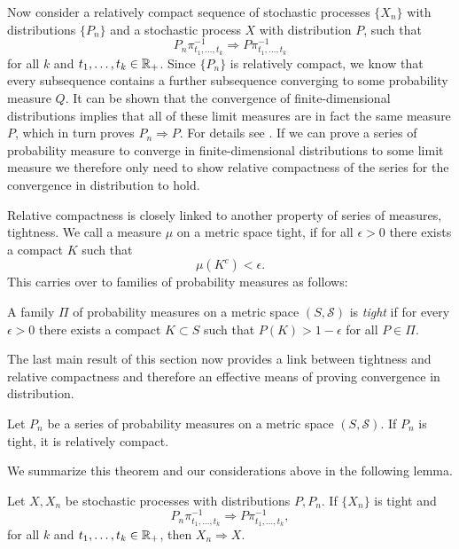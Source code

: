 Now consider a relatively compact sequence of stochastic processes $\{X_n\}$
with distributions $\{P_n\}$
and a stochastic process $X$ with distribution $P$,
such that
\begin{equation}
	P_n\pi^{-1}_{t_1, \dots, t_k} \Rightarrow P\pi^{-1}_{t_1, \dots, t_k}
\end{equation}
for all $k$ and $t_1, \dots, t_k \in \mathbb{R}_+$.
Since $\{P_n\}$ is relatively compact,
we know that every subsequence contains a further subsequence converging to some probability measure $Q$.
It can be shown that the convergence of finite-dimensional distributions implies that all of these
limit measures are in fact the same measure $P$,
which in turn proves $P_n \Rightarrow P$. For details see \cite[p.57f.]{Billingsley.1999}.
If we can prove a series of probability measure to converge in finite-dimensional distributions to some
limit measure we therefore only need to show relative compactness of the series
for the convergence in distribution to hold.

\bigskip

Relative compactness is closely linked to another property of series of measures, tightness.
We call a measure $\mu$ on a metric space tight,
if for all $\epsilon > 0$ there exists a compact $K$ such that
\begin{equation}
	\mu(K^c) < \epsilon.
\end{equation}
This carries over to families of probability measures as follows:
\begin{definition} \label{D: tightness}
	A family $\Pi$ of probability measures on a metric space $(S, \mathcal{S})$ is \emph{tight} 
	if for every $\epsilon > 0$ there exists a compact $K \subset S$
	such that $P(K) > 1 - \epsilon$
	for all $P \in \Pi$.	
\end{definition}

The last main result of this section now provides a link between tightness and relative compactness
and therefore an effective means of proving convergence in distribution.

\begin{theorem} \label{T: Prohorov}
	Let $P_n$ be a series of probability measures on a metric space $(S, \mathcal{S})$. 
	If $P_n$ is tight, it is relatively compact.
\end{theorem}
We summarize this theorem and our considerations above in the following lemma.
\begin{lemma} \label{L: tightness and fidi}
	Let $X, X_n$ be stochastic processes with distributions $P, P_n$.
	If $\{X_n\}$  is tight and
	\begin{equation*}
		P_n\pi^{-1}_{t_1, \dots, t_k} \Rightarrow P\pi^{-1}_{t_1, \dots, t_k},
	\end{equation*}
	for all $k$ and $t_1, \dots, t_k \in \mathbb{R}_+$,
	then $X_n \Rightarrow X$.
\end{lemma}


